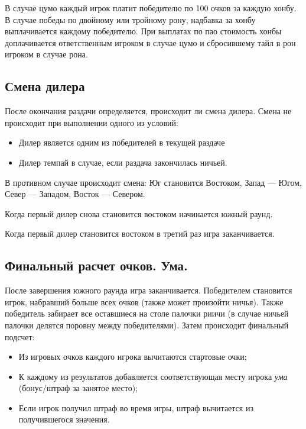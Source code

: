 В случае цумо каждый игрок платит победителю по 100 очков за каждую хонбу. В случае победы по двойному или тройному рону, надбавка за хонбу выплачивается каждому победителю. При выплатах по пао стоимость хонбы доплачивается ответственным игроком в случае цумо и сбросившему тайл в рон игроком в случае рона. 

\subsection{Смена дилера}
После окончания раздачи определяется, происходит ли смена дилера.
Смена не происходит при выполнении одного из условий:
\begin{itemize}
	\item Дилер является одним из победителей в текущей раздаче
	\item Дилер темпай в случае, если раздача закончилась ничьей.
\end{itemize}
В противном случае происходит смена: Юг становится Востоком, Запад --- Югом, Север --- Западом, Восток --- Севером.

Когда первый дилер снова становится востоком начинается южный раунд. 

Когда первый дилер становится востоком в третий раз игра заканчивается.

\subsection{Финальный расчет очков. Ума.}
После завершения южного раунда игра заканчивается. Победителем становится игрок, набравший больше всех очков (также может произойти ничья). Также победитель забирает все оставшиеся на столе палочки риичи (в случае ничьей палочки делятся поровну между победителями).
Затем происходит финальный подсчет:
\begin{itemize}
	\item Из игровых очков каждого игрока вычитаются стартовые очки;
	\item К каждому из результатов добавляется соответствующая месту игрока \textit{ума} (бонус/штраф за занятое место);
	\item Если игрок получил штраф во время игры, штраф вычитается из получившегося значения.
\end{itemize}

